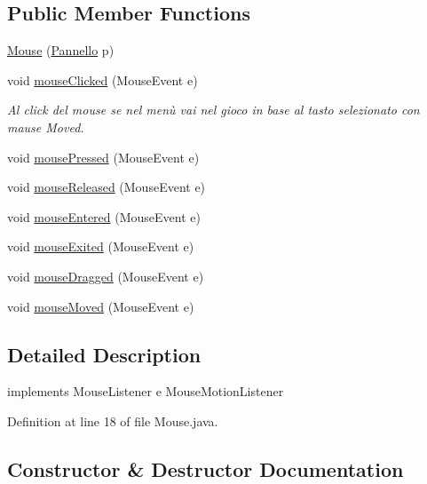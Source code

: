 \subsection*{Public Member Functions}
\begin{DoxyCompactItemize}
\item 
\hyperlink{classa_1_1survival_1_1game_1_1_mouse_aba3943ecdc85f5954f6fde58eace1b95}{Mouse} (\hyperlink{classa_1_1survival_1_1game_1_1_pannello}{Pannello} p)
\item 
void \hyperlink{classa_1_1survival_1_1game_1_1_mouse_a45d56bd84238e8b56589dfc732e2b2cf}{mouse\+Clicked} (Mouse\+Event e)
\begin{DoxyCompactList}\small\item\em Al click del mouse se nel menù vai nel gioco in base al tasto selezionato con mause Moved. \end{DoxyCompactList}\item 
void \hyperlink{classa_1_1survival_1_1game_1_1_mouse_aed82e1ce3dd3cf283d508c3ba3be70ef}{mouse\+Pressed} (Mouse\+Event e)
\item 
void \hyperlink{classa_1_1survival_1_1game_1_1_mouse_a87a07291794e15052db67f945d90853e}{mouse\+Released} (Mouse\+Event e)
\item 
void \hyperlink{classa_1_1survival_1_1game_1_1_mouse_a74e5095765312765f33ed268095a2cb2}{mouse\+Entered} (Mouse\+Event e)
\item 
void \hyperlink{classa_1_1survival_1_1game_1_1_mouse_aa14a60f36cdd6abc1d90ce56d39218eb}{mouse\+Exited} (Mouse\+Event e)
\item 
void \hyperlink{classa_1_1survival_1_1game_1_1_mouse_adbfc0588c017133c9b7070474402b72f}{mouse\+Dragged} (Mouse\+Event e)
\item 
void \hyperlink{classa_1_1survival_1_1game_1_1_mouse_a2ca251710b65639ec80bc141edde60aa}{mouse\+Moved} (Mouse\+Event e)
\end{DoxyCompactItemize}


\subsection{Detailed Description}
implements Mouse\+Listener e Mouse\+Motion\+Listener 

Definition at line 18 of file Mouse.\+java.



\subsection{Constructor \& Destructor Documentation}
\mbox{\label{classa_1_1survival_1_1game_1_1_mouse_aba3943ecdc85f5954f6fde58eace1b95}} 
